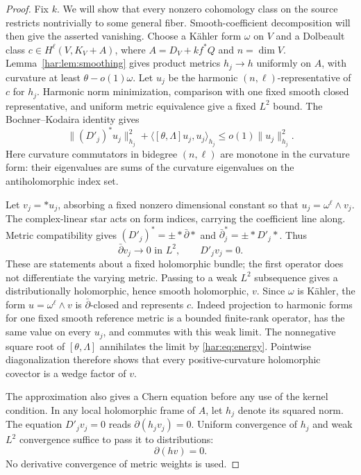\begin{proof}
Fix \(k\). We will show that every nonzero cohomology class on the
source restricts nontrivially to some general fiber. Smooth-coefficient
decomposition will then give the asserted vanishing. Choose a Kähler
form \(\omega\) on \(V\) and a Dolbeault class
\(c\in H^\ell(V,K_V+A)\), where \(A=D_V+kf^*Q\) and \(n=\dim V\).
Lemma~\ref{har:lem:smoothing} gives product metrics \(h_j\to h\) uniformly
on \(A\), with curvature at least \(\theta-o(1)\omega\). Let \(u_j\)
be the harmonic \((n,\ell)\)-representative of \(c\) for \(h_j\).
Harmonic norm minimization, comparison with one fixed smooth closed
representative, and uniform metric equivalence give a fixed \(L^2\) bound.
The Bochner--Kodaira identity gives
\begin{equation}\label{har:eq:energy}
 \|(D'_j)^*u_j\|_{h_j}^2
 +\langle[\theta,\Lambda]u_j,u_j\rangle_{h_j}
 \le o(1)\|u_j\|_{h_j}^2.
\end{equation}
Here curvature commutators in bidegree \((n,\ell)\) are monotone in the
curvature form: their eigenvalues are sums of the curvature eigenvalues
on the antiholomorphic index set.

Let \(v_j=*u_j\), absorbing a fixed nonzero dimensional constant so that
\(u_j=\omega^\ell\wedge v_j\). The complex-linear star acts on form
indices, carrying the coefficient line along. Metric compatibility gives
\((D'_j)^*=\pm*\bar\partial*\) and
\(\bar\partial_j^*=\pm*D'_j*\). Thus
\[
 \bar\partial v_j\longrightarrow0\text{ in }L^2,
 \qquad D'_jv_j=0.
\]
These are statements about a fixed holomorphic bundle; the first
operator does not differentiate the varying metric. Passing to a weak
\(L^2\) subsequence gives a distributionally holomorphic, hence smooth
holomorphic, \(v\). Since \(\omega\) is Kähler, the form
\(u=\omega^\ell\wedge v\) is \(\bar\partial\)-closed and represents
\(c\). Indeed projection to harmonic forms for one fixed smooth
reference metric is a bounded finite-rank operator, has the same value
on every \(u_j\), and commutes with this weak limit. The nonnegative
square root of \([\theta,\Lambda]\) annihilates the limit by \eqref{har:eq:energy}.
Pointwise diagonalization therefore shows that every positive-curvature
holomorphic covector is a wedge factor of \(v\).

The approximation also gives a Chern equation before any use of the
kernel condition. In any local holomorphic frame of \(A\), let
\(h_j\) denote its squared norm. The equation \(D'_jv_j=0\) reads
\(\partial(h_jv_j)=0\). Uniform convergence of \(h_j\) and weak
\(L^2\) convergence suffice to pass it to distributions:
\begin{equation}\label{har:eq:distribution}
 \partial(hv)=0.
\end{equation}
No derivative convergence of metric weights is used.


\end{proof}
